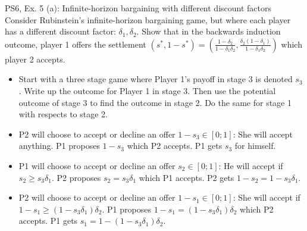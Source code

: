 \begin{frame}{PS6, Ex. 5 (a): Infinite-horizon bargaining with different discount factors}
    Consider Rubinstein's infinite-horizon bargaining game, but where each player has a different discount factor: $\delta_1,\delta_2$. Show that in the backwards induction outcome, player 1 offers the settlement
    $(s^{*},1-s^{*})=\left( \frac{1-\delta_2}{1-\delta_1\delta_2},\frac{\delta_2(1-\delta_1)}{1-\delta_1\delta_2}\right)$
    which player 2 accepts.
    \begin{itemize}
      \item[(Step a)] Start with a three stage game where Player 1's payoff in stage 3 is denoted $s_3$. Write up the outcome for Player 1 in stage 3. Then use the potential outcome of stage 3 to find the outcome in stage 2. Do the same for stage 1 with respects to stage 2.
    \end{itemize}
    \begin{itemize}
        \item[Stage 3] P2 will choose to accept or decline an offer $1-s_3\in [0;1]$: She will accept anything. P1 proposes $1-s_3$ which P2 accepts. P1 gets $s_3$ for himself.
        \item[Stage 2] P1 will choose to accept or decline an offer $s_2 \in [0;1]$: He will accept if $s_2 \geq s_3\delta_1$. P2 proposes $s_2 = s_3\delta_1$ which P1 accepts. P2 gets $1-s_2 = 1-s_3\delta_1$.
        \item[Stage 1] P2 will choose to accept or decline an offer $1-s_1 \in [0;1]$: She will accept if $1-s_1 \geq (1-s_3\delta_1)\delta_2$. P1 proposes $1-s_1 = (1-s_3\delta_1)\delta_2$ which P2 accepts. P1 gets $s_1 =1-(1-s_3\delta_1)\delta_2$.
    \end{itemize}
     \vfill\null
\end{frame}


